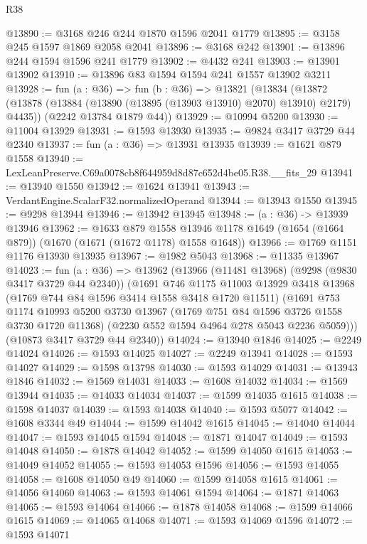\begin{lexlean}{R38}
\begin{coremodule}
@13890 := @3168 @246 @244 @1870 @1596 @2041 @1779
@13895 := @3158 @245 @1597 @1869 @2058 @2041
@13896 := @3168 @242
@13901 := @13896 @244 @1594 @1596 @241 @1779
@13902 := @4432 @241
@13903 := @13901 @13902
@13910 := @13896 @83 @1594 @1594 @241 @1557 @13902 @3211
@13928 := fun (a : @36) =>
  fun (b : @36) =>
  @13821
    (@13834
      (@13872 (@13878 (@13884 (@13890 (@13895 (@13903 @13910) @2070) @13910) @2179) @4435))
      (@2242 @13784 @1879 @44))
@13929 := @10994 @5200
@13930 := @11004 @13929
@13931 := @1593 @13930
@13935 := @9824 @3417 @3729 @44 @2340
@13937 := fun (a : @36) => @13931 @13935
@13939 := @1621 @879 @1558
@13940 := LexLeanPreserve.C69a0078cb8f644959d8d87c652d4be05.R38.__fits_29
@13941 := @13940 @1550
@13942 := @1624 @13941
@13943 := VerdantEngine.ScalarF32.normalizedOperand
@13944 := @13943 @1550
@13945 := @9298 @13944
@13946 := @13942 @13945
@13948 := (a : @36) -> @13939 @13946
@13962 := @1633
    @879
    @1558
    @13946
    @1178
    @1649
    (@1654 (@1664 @879))
    (@1670 (@1671 (@1672 @1178) @1558 @1648))
@13966 := @1769 @1151 @1176 @13930 @13935
@13967 := @1982 @5043
@13968 := @11335 @13967
@14023 := fun (a : @36) =>
  @13962
    (@13966
      (@11481 @13968)
      (@9298 (@9830 @3417 @3729 @44 @2340))
      (@1691
        @746
        @1175
        @11003
        @13929
        @3418
        @13968
        (@1769 @744 @84 @1596 @3414 @1558 @3418 @1720 @11511)
        (@1691
          @753
          @1174
          @10993
          @5200
          @3730
          @13967
          (@1769 @751 @84 @1596 @3726 @1558 @3730 @1720 @11368)
          (@2230 @552 @1594 @4964 @278 @5043 @2236 @5059)))
      (@10873 @3417 @3729 @44 @2340))
@14024 := @13940 @1846
@14025 := @2249 @14024
@14026 := @1593 @14025
@14027 := @2249 @13941
@14028 := @1593 @14027
@14029 := @1598 @13798
@14030 := @1593 @14029
@14031 := @13943 @1846
@14032 := @1569 @14031
@14033 := @1608 @14032
@14034 := @1569 @13944
@14035 := @14033 @14034
@14037 := @1599 @14035 @1615
@14038 := @1598 @14037
@14039 := @1593 @14038
@14040 := @1593 @5077
@14042 := @1608 @3344 @49
@14044 := @1599 @14042 @1615
@14045 := @14040 @14044
@14047 := @1593 @14045 @1594
@14048 := @1871 @14047
@14049 := @1593 @14048
@14050 := @1878 @14042
@14052 := @1599 @14050 @1615
@14053 := @14049 @14052
@14055 := @1593 @14053 @1596
@14056 := @1593 @14055
@14058 := @1608 @14050 @49
@14060 := @1599 @14058 @1615
@14061 := @14056 @14060
@14063 := @1593 @14061 @1594
@14064 := @1871 @14063
@14065 := @1593 @14064
@14066 := @1878 @14058
@14068 := @1599 @14066 @1615
@14069 := @14065 @14068
@14071 := @1593 @14069 @1596
@14072 := @1593 @14071

\end{coremodule}
\end{lexlean}
